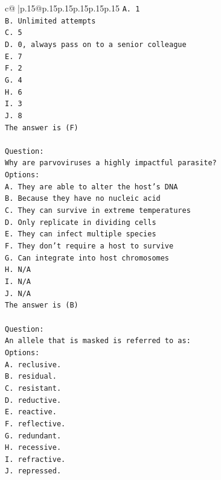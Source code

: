 \documentclass{article}
\begin{document}
{\begin{supertabular}{c@{$\;$}|p{.15\linewidth}@{}p{.15\linewidth}p{.15\linewidth}p{.15\linewidth}p{.15\linewidth}p{.15\linewidth}}
{{{\texttt{A. 1} \\
\texttt{B. Unlimited attempts} \\
\texttt{C. 5} \\
\texttt{D. 0, always pass on to a senior colleague} \\
\texttt{E. 7} \\
\texttt{F. 2} \\
\texttt{G. 4} \\
\texttt{H. 6} \\
\texttt{I. 3} \\
\texttt{J. 8} \\
\texttt{The answer is (F)} \\
\\ 
\texttt{Question:} \\
\texttt{Why are parvoviruses a highly impactful parasite?} \\
\texttt{Options:} \\
\texttt{A. They are able to alter the host's DNA} \\
\texttt{B. Because they have no nucleic acid} \\
\texttt{C. They can survive in extreme temperatures} \\
\texttt{D. Only replicate in dividing cells} \\
\texttt{E. They can infect multiple species} \\
\texttt{F. They don't require a host to survive} \\
\texttt{G. Can integrate into host chromosomes} \\
\texttt{H. N/A} \\
\texttt{I. N/A} \\
\texttt{J. N/A} \\
\texttt{The answer is (B)} \\
\\ 
\texttt{Question:} \\
\texttt{An allele that is masked is referred to as:} \\
\texttt{Options:} \\
\texttt{A. reclusive.} \\
\texttt{B. residual.} \\
\texttt{C. resistant.} \\
\texttt{D. reductive.} \\
\texttt{E. reactive.} \\
\texttt{F. reflective.} \\
\texttt{G. redundant.} \\
\texttt{H. recessive.} \\
\texttt{I. refractive.} \\
\texttt{J. repressed.} \\
            }
        }
    }
     \\ \\


\end{supertabular}}
\end{document}
